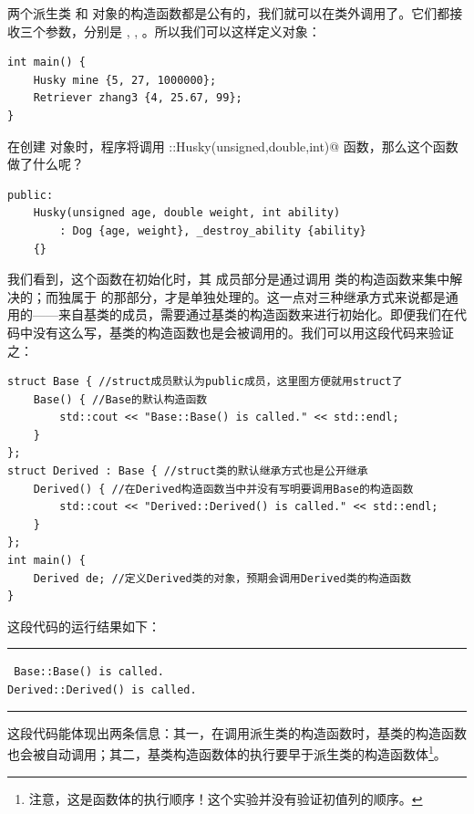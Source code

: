 两个派生类 \lstinline@Husky@ 和 \lstinline@Retriever@ 对象的构造函数都是公有的，我们就可以在类外调用了。它们都接收三个参数，分别是 \lstinline@age@, \lstinline@weight@, \lstinline@ability@。所以我们可以这样定义对象：
\begin{lstlisting}
int main() {
    Husky mine {5, 27, 1000000};
    Retriever zhang3 {4, 25.67, 99};
}
\end{lstlisting}
在创建 \lstinline@mine@ 对象时，程序将调用 \lstinline@Husky::Husky(unsigned,double,int)@ 函数，那么这个函数做了什么呢？
\begin{lstlisting}
public:
    Husky(unsigned age, double weight, int ability)
        : Dog {age, weight}, _destroy_ability {ability}
    {}
\end{lstlisting}\par
我们看到，这个函数在初始化时，其 \lstinline@Dog@ 成员部分是通过调用 \lstinline@Dog@ 类的构造函数来集中解决的；而独属于 \lstinline@Husky@ 的那部分，才是单独处理的。这一点对三种继承方式来说都是通用的——来自基类的成员，需要通过基类的构造函数来进行初始化。即便我们在代码中没有这么写，基类的构造函数也是会被调用的。我们可以用这段代码来验证之：
\begin{lstlisting}
struct Base { //struct成员默认为public成员，这里图方便就用struct了
    Base() { //Base的默认构造函数
        std::cout << "Base::Base() is called." << std::endl;
    }
};
struct Derived : Base { //struct类的默认继承方式也是公开继承
    Derived() { //在Derived构造函数当中并没有写明要调用Base的构造函数
        std::cout << "Derived::Derived() is called." << std::endl;
    }
};
int main() {
    Derived de; //定义Derived类的对象，预期会调用Derived类的构造函数
}
\end{lstlisting}
这段代码的运行结果如下：\\\noindent\rule{\linewidth}{.2pt}\texttt{
Base::Base() is called.\\
Derived::Derived() is called.
}\\\noindent\rule{\linewidth}{.2pt}
这段代码能体现出两条信息：其一，在调用派生类的构造函数时，基类的构造函数也会被自动调用；其二，基类构造函数体的执行要早于派生类的构造函数体\footnote{注意，这是函数体的执行顺序！这个实验并没有验证初值列的顺序。}。\par
